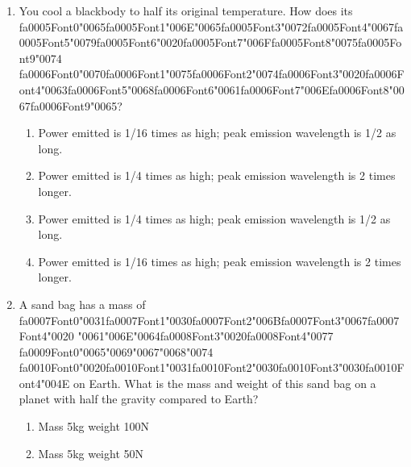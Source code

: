 \documentclass[12pt]{article}
\begin{document}
\begin{enumerate}[label=\arabic*.]
\begin{enumerate}[label=(\alph*)]
\end{enumerate}
\item You cool a blackbody to half its original temperature. How does its {\csname fa0005Font0\endcsname\char"0065}{\csname fa0005Font1\endcsname\char"006E}{\char"0065}{\csname fa0005Font3\endcsname\char"0072}{\csname fa0005Font4\endcsname\char"0067}{\csname fa0005Font5\endcsname\char"0079}{\csname fa0005Font6\endcsname\char"0020}{\csname fa0005Font7\endcsname\char"006F}{\csname fa0005Font8\endcsname\char"0075}{\csname fa0005Font9\endcsname\char"0074} {\csname fa0006Font0\endcsname\char"0070}{\csname fa0006Font1\endcsname\char"0075}{\csname fa0006Font2\endcsname\char"0074}{\csname fa0006Font3\endcsname\char"0020}{\csname fa0006Font4\endcsname\char"0063}{\csname fa0006Font5\endcsname\char"0068}{\csname fa0006Font6\endcsname\char"0061}{\csname fa0006Font7\endcsname\char"006E}{\csname fa0006Font8\endcsname\char"0067}{\csname fa0006Font9\endcsname\char"0065}?
\begin{enumerate}[label=(\alph*)]
    \item Power emitted is 1/16 times as high; peak emission wavelength is 1/2 as long.
    \item Power emitted is 1/4 times as high; peak emission wavelength is 2 times longer.
    \item Power emitted is 1/4 times as high; peak emission wavelength is 1/2 as long.
    \item Power emitted is 1/16 times as high; peak emission wavelength is 2 times longer.
\end{enumerate}
\item A sand bag has a mass of {\csname fa0007Font0\endcsname\char"0031}{\csname fa0007Font1\endcsname\char"0030}{\csname fa0007Font2\endcsname\char"006B}{\csname fa0007Font3\endcsname\char"0067}{\csname fa0007Font4\endcsname\char"0020} {\char"0061}{\char"006E}{\char"0064}{\csname fa0008Font3\endcsname\char"0020}{\csname fa0008Font4\endcsname\char"0077} {\csname fa0009Font0\endcsname\char"0065}{\char"0069}{\char"0067}{\char"0068}{\char"0074} {\csname fa0010Font0\endcsname\char"0020}{\csname fa0010Font1\endcsname\char"0031}{\csname fa0010Font2\endcsname\char"0030}{\csname fa0010Font3\endcsname\char"0030}{\csname fa0010Font4\endcsname\char"004E} on Earth. What is the mass and weight of this
sand bag on a planet with half the gravity compared to Earth?
\begin{enumerate}[label=(\alph*)]
    \item Mass 5kg weight 100N
    \item Mass 5kg weight 50N

\end{enumerate}
\end{enumerate}
\end{document}
